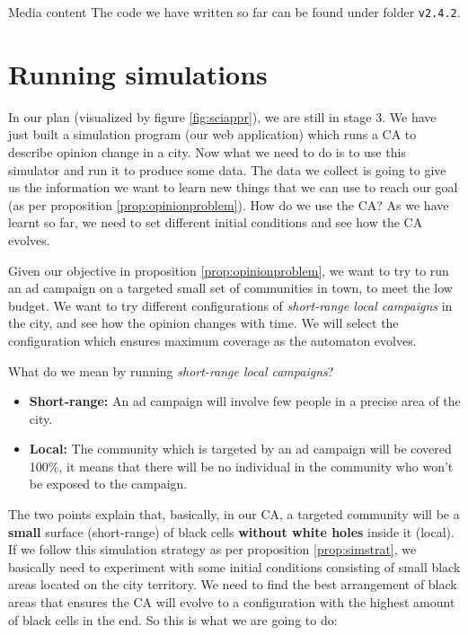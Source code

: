 \begin{trailer}{Media content}
The code we have written so far can be found under folder \texttt{v2.4.2}.
\end{trailer}

\section{Running simulations}
In our plan (visualized by figure \ref{fig:sciappr}), we are still in stage 3. We have just built
a simulation program (our web application) which runs a CA to describe opinion change in a
city. Now what we need to do is to use this simulator and run it to produce some data. The data
we collect is going to give us the information we want to learn new things that we can use to reach
our goal (as per proposition \ref{prop:opinionproblem}). How do we use the CA? As we have learnt
so far, we need to set different initial conditions and see how the CA evolves.

\begin{proposition}
\label{prop:simstrat}
Given our objective in proposition \ref{prop:opinionproblem}, we want to try to run an ad
campaign on a targeted small set of communities in town, to meet the low budget. We want to try
different configurations of \textit{short-range local campaigns} in the city,
and see how the opinion changes with time. We will select the configuration which ensures
maximum coverage as the automaton evolves.
\end{proposition}

What do we mean by running \textit{short-range local campaigns}?

\begin{itemize}
\item \textbf{Short-range:} An ad campaign will involve few people in a precise area of the city.
\item \textbf{Local:} The community which is targeted by an ad campaign will be covered 100\%, it
means that there will be no individual in the community who won't be exposed to the campaign.
\end{itemize}

The two points explain that, basically, in our CA,
a targeted community will be a \textbf{small} surface (short-range) of black cells
\textbf{without white holes} inside it (local). If we follow this simulation strategy as per proposition
\ref{prop:simstrat}, we basically need to experiment with some initial conditions consisting of small
black areas located on the city territory. We need to find the best arrangement of black areas that
ensures the CA will evolve to a configuration with the highest amount of black cells in the end.
So this is what we are going to do:

